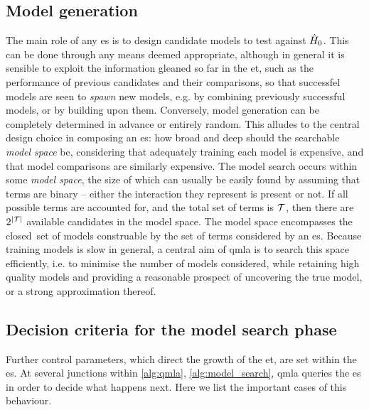 \subsection{Model generation}\label{sec:model_generation}
The main role of any \gls{es} is to design candidate models to test against $\hat{H}_0$. 
This can be done through any means deemed appropriate, 
    although in general it is sensible to exploit the information gleaned so far in the \gls{et}, 
    such as the performance of previous candidates and their comparisons, 
    so that successfel models are seen to \emph{\gls{spawn}} new models, 
    e.g. by combining previously successful models, or by building upon them. 
Conversely, model generation can be completely determined in advance or entirely random.
This alludes to the central design choice in composing an \gls{es}: 
    how broad and deep should the searchable \emph{model space} be, 
    considering that adequately training each model
    is expensive, and that model comparisons are similarly expensive. 
The  \gls{model search}  occurs within some \emph{\gls{model space}}, the size of which can usually be easily found 
    by assuming that terms are binary -- either the interaction they represent is present or not. 
If all possible terms are accounted for, and the total set of terms is $\mathcal{T}$,
    then there are $2^{\left\lvert \mathcal{T} \right\rvert}$ available candidates in the model space. 
The \gls{model space} encompasses the closed\footnotemark \ set of models construable by the set of terms considered by an \gls{es}. 
Because training models is slow in general,
    a central aim of \gls{qmla} is to search this space efficiently,
    i.e. to minimise the number of models considered, while retaining high quality models and 
    providing a reasonable prospect of uncovering the \gls{true model}, or a strong approximation thereof. 




\subsection{Decision criteria for the model search phase}
Further control parameters, which direct the growth of the \gls{et}, are set within the \gls{es}.
At several junctions within \cref{alg:qmla}, \cref{alg:model_search}, 
    \gls{qmla} queries the \gls{es} in order to decide what happens next.
Here we list the important cases of this behaviour. 


